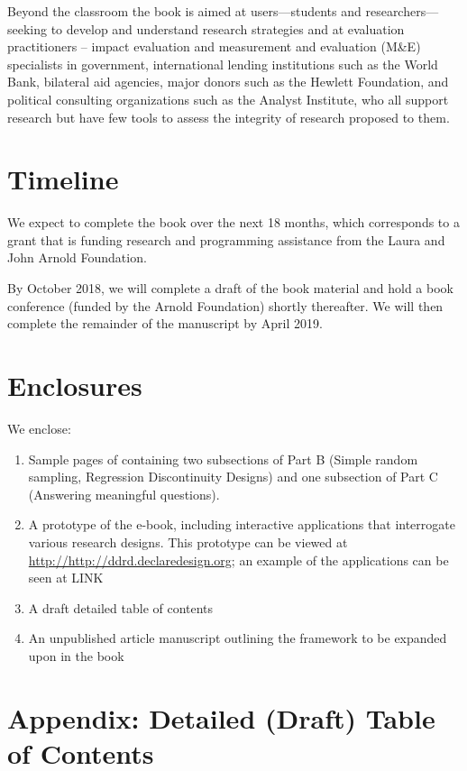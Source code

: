 \documentclass[11pt]{article}
\begin{document}
Beyond the classroom the book is aimed at users---students and researchers---seeking to develop and understand research strategies and at evaluation practitioners -- impact evaluation and measurement and evaluation (M\&E) specialists in government, international lending institutions such as the World Bank, bilateral aid agencies, major donors such as the Hewlett Foundation, and political consulting organizations such as the Analyst Institute, who all support research but have few tools to assess the  integrity of research proposed to them.


\section{Timeline}

We expect to complete the book over the next 18 months, which corresponds to a grant that is funding research and programming assistance from the Laura and John Arnold Foundation.

By October 2018, we will complete a draft of the book material and hold a book conference (funded by the Arnold Foundation) shortly thereafter. We will then complete the remainder of the manuscript by April 2019.

\section{Enclosures}

We enclose:

\begin{enumerate}
\item Sample pages of containing two subsections of Part B (Simple random sampling, Regression Discontinuity Designs) and one subsection of Part C (Answering meaningful questions). 
\item A prototype of the e-book, including interactive applications that interrogate various research designs. This prototype can be viewed at \url{http://http://ddrd.declaredesign.org}; an example of the applications can be seen at LINK
\item A draft detailed table of contents
\item An unpublished article manuscript outlining the framework to be expanded upon in the book
\end{enumerate}	

\clearpage\newpage


\appendix
\section{Appendix: Detailed (Draft) Table of Contents \label{app:toc}}
\end{document}
